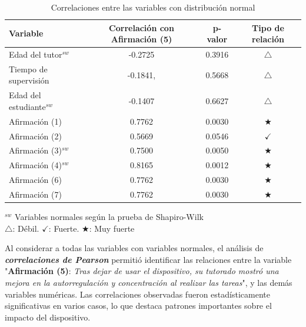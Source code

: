 				\begin{table}[h!]
					\centering
					\caption{Correlaciones entre las variables con distribución normal}
					\begin{tabularx}{0.75\textwidth}{Xccc}
						\toprule
						\textbf{Variable} & \textbf{Correlación con Afirmación (5)} &  \textbf{p-valor} & \textbf{Tipo de relación} \\
						\midrule
						Edad del tutor$^{sw}$ & -0.2725 & 0.3916 & \(\bigtriangleup\) \\ %
						Tiempo de supervisión & -0.1841, & 0.5668 & \(\bigtriangleup\) \\ %
						Edad del estudiante$^{sw}$ & -0.1407 & 0.6627 & \(\bigtriangleup\) \\ %
						Afirmación (1) & 0.7762 & 0.0030 & \(\bigstar\) \\ %
						Afirmación (2) & 0.5669 & 0.0546 & \(\checkmark\) \\ %
						Afirmación (3)$^{sw}$ & 0.7500 & 0.0050 & \(\bigstar\) \\ %
						Afirmación (4)$^{sw}$ & 0.8165 & 0.0012 & \(\bigstar\) \\ %
						Afirmación (6) & 0.7762 & 0.0030 & \(\bigstar\) \\ %
						Afirmación (7) & 0.7762 & 0.0030 & \(\bigstar\) \\ %
						\bottomrule
					\end{tabularx}
					\label{table:Pearson-Correlation}
					\vspace{0.3em} %
					\parbox{0.75\textwidth}{\footnotesize
						$^{sw}$ Variables normales según la prueba de Shapiro-Wilk\\
						\(\bigtriangleup\): Débil. \(\checkmark\): Fuerte. \(\bigstar\): Muy fuerte
					}
				\end{table}
				
				Al considerar a todas las variables con variables normales, el análisis de \textit{\textbf{correlaciones de Pearson}} permitió identificar las relaciones entre la variable "\textbf{Afirmación (5)}: \textit{Tras dejar de usar el dispositivo, su tutorado mostró una mejora en la autorregulación y concentración al realizar las tareas}", y las demás variables numéricas. Las correlaciones observadas fueron estadísticamente significativas en varios casos, lo que destaca patrones importantes sobre el impacto del dispositivo.
				
